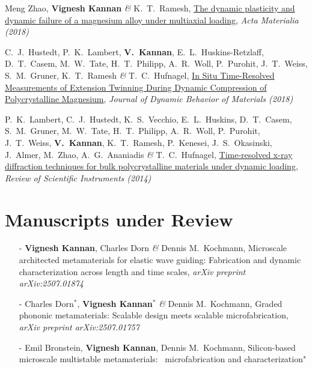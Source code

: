 \documentclass[a4paper,10pt, oneside]{article}
\begin{document}
\begin{enumerate}[label={[\arabic*]}, leftmargin=*]
		\item Meng Zhao, \textbf{Vignesh Kannan} \emph{\&} K.~T.~Ramesh, \href{https://www.sciencedirect.com/science/article/pii/S1359645418303641}{The dynamic plasticity and dynamic failure of a magnesium alloy under multiaxial loading}, \textit{Acta Materialia (2018)} \label{actmat2018}
		\item C.~J.~Hustedt, P.~K.~Lambert, \textbf{V.~Kannan}, E.~L.~Huskins-Retzlaff, D.~T.~Casem, M.~W.~Tate, H.~T.~Philipp, A.~R.~Woll, P.~Purohit, J.~T.~Weiss, S.~M.~Gruner, K.~T.~Ramesh \emph{\&} T.~C.~Hufnagel, \href{https://link.springer.com/article/10.1007/s40870-018-0152-8}{In Situ Time-Resolved Measurements of Extension Twinning During Dynamic Compression of Polycrystalline Magnesium}, \textit{Journal of Dynamic Behavior of Materials (2018)} \label{jdbm2018}
		\item P.~K.~Lambert, C.~J.~Hustedt, K.~S.~Vecchio, E.~L.~Huskins, D.~T.~Casem, S.~M.~Gruner, M.~W.~Tate, H.~T.~Philipp, A.~R.~Woll, P.~Purohit, J.~T.~Weiss, \textbf{V.~Kannan}, K.~T.~Ramesh, P.~Kenesei, J.~S.~Okasinski, J.~Almer, M.~Zhao, A.~G.~Ananiadis \emph{\&} T.~C.~Hufnagel, \href{https://aip.scitation.org/doi/full/10.1063/1.4893881}{Time-resolved x-ray diffraction techniques for bulk polycrystalline materials under dynamic loading}, \textit{Review of Scientific Instruments (2014)} \label{rsi2014}
	\end{enumerate}
	
	\section*{{Manuscripts under Review}}
	\begin{itemize}[wide, labelwidth=!, labelindent=0em]
		\itemsep0em
		\item[-] \textbf{Vignesh Kannan}, Charles Dorn \emph{\&} Dennis M.~Kochmann, Microscale architected metamaterials for elastic wave guiding: Fabrication and dynamic characterization across length and time scales, \textit{arXiv preprint arXiv:2507.01874} \label{waferwavesmethods}
		\item[-] Charles Dorn$^{*}$, \textbf{Vignesh Kannan}$^{*}$ \emph{\&} Dennis M.~Kochmann, Graded phononic metamaterials: Scalable design meets scalable microfabrication, \textit{arXiv preprint arXiv:2507.01757} \label{waferwavesdesign}
		\item[-] Emil Bronstein, \textbf{Vignesh Kannan}, Dennis M.~Kochmann, Silicon-based microscale multistable metamaterials:~ microfabrication and characterization"
	\end{itemize}
	
\end{document}

